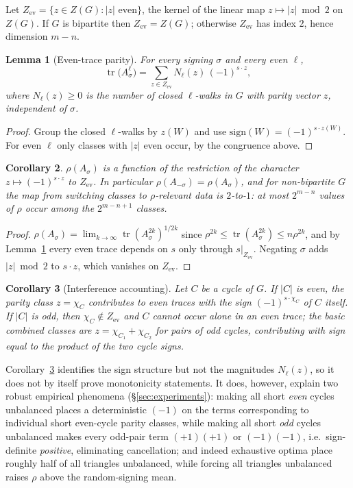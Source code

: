 \documentclass[11pt]{article}
\newtheorem{lemma}{Lemma}
\newtheorem{corollary}[lemma]{Corollary}
\theoremstyle{remark}
\newcommand{\Ze}{Z_{\mathrm{ev}}}
\newcommand{\rhomax}{\rho}
\DeclareMathOperator{\tr}{tr}
\begin{document}
Let $\Ze=\{z\in Z(G):|z|\text{ even}\}$, the kernel of the linear map
$z\mapsto|z|\bmod2$ on $Z(G)$. If $G$ is bipartite then $\Ze=Z(G)$;
otherwise $\Ze$ has index $2$, hence dimension $m-n$.

\begin{lemma}[Even-trace parity]\label{lem:parity}
For every signing $\sigma$ and every even $\ell$,
\[
\tr\!\big(A_\sigma^{\ell}\big)
=\sum_{z\in \Ze} N_\ell(z)\,(-1)^{s\cdot z},
\]
where $N_\ell(z)\ge0$ is the number of closed $\ell$-walks in $G$ with
parity vector $z$, independent of $\sigma$.
\end{lemma}

\begin{proof}
Group the closed $\ell$-walks by $z(W)$ and use
$\mathrm{sign}(W)=(-1)^{s\cdot z(W)}$. For even $\ell$ only classes with
$|z|$ even occur, by the congruence above.
\end{proof}

\begin{corollary}\label{cor:evenchar}
$\rhomax(A_\sigma)$ is a function of the restriction of the character
$z\mapsto(-1)^{s\cdot z}$ to $\Ze$. In particular
$\rhomax(A_{-\sigma})=\rhomax(A_\sigma)$, and for non-bipartite $G$ the
map from switching classes to $\rhomax$-relevant data is $2$-to-$1$: at
most $2^{m-n}$ values of $\rhomax$ occur among the $2^{m-n+1}$ classes.
\end{corollary}

\begin{proof}
$\rhomax(A_\sigma)=\lim_{k\to\infty}\tr(A_\sigma^{2k})^{1/2k}$ since
$\rhomax^{2k}\le\tr(A_\sigma^{2k})\le n\rhomax^{2k}$, and by
Lemma~\ref{lem:parity} every even trace depends on $s$ only through
$s|_{\Ze}$. Negating $\sigma$ adds $|z|\bmod 2$ to $s\cdot z$, which
vanishes on $\Ze$.
\end{proof}

\begin{corollary}[Interference accounting]\label{cor:interference}
Let $C$ be a cycle of $G$.
If $|C|$ is even, the parity class $z=\chi_C$ contributes to even traces
with the sign $(-1)^{s\cdot\chi_C}$ of $C$ itself. If $|C|$ is odd, then
$\chi_C\notin\Ze$ and $C$ cannot occur alone in an even trace; the basic
combined classes are $z=\chi_{C_1}+\chi_{C_2}$ for pairs of odd cycles,
contributing with sign equal to the \emph{product} of the two cycle signs.
\end{corollary}

Corollary~\ref{cor:interference} identifies the sign structure but not
the magnitudes $N_\ell(z)$, so it does not by itself prove monotonicity
statements. It does, however, explain two robust empirical phenomena
(\S\ref{sec:experiments}): making all short \emph{even} cycles unbalanced
places a deterministic $(-1)$ on the terms corresponding to individual
short even-cycle parity classes, while making all short \emph{odd} cycles
unbalanced makes every odd-pair term
$(+1)(+1)$ or $(-1)(-1)$, i.e.\ sign-definite \emph{positive},
eliminating cancellation; and indeed exhaustive optima place roughly half
of all triangles unbalanced, while forcing all triangles unbalanced
raises $\rhomax$ above the random-signing mean.
\end{document}
